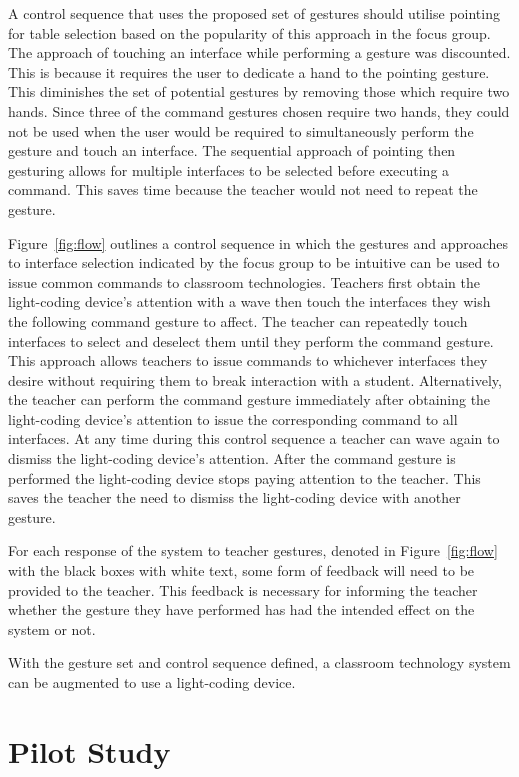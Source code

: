 \documentclass[link]{IWCOMP}
\begin{document}
A control sequence that uses the proposed set of gestures should utilise pointing for table selection based on the popularity of this approach in the focus group.
The approach of touching an interface while performing a gesture was discounted.  
This is because it requires the user to dedicate a hand to the pointing gesture.  
This diminishes the set of potential gestures by removing those which require two hands.
Since three of the command gestures chosen require two hands, they could not be used when the user would be required to simultaneously perform the gesture and touch an interface.
The sequential approach of pointing then gesturing allows for multiple interfaces to be selected before executing a command.
This saves time because the teacher would not need to repeat the gesture.

Figure~\ref{fig:flow} outlines a control sequence in which the gestures and approaches to interface selection indicated by the focus group to be intuitive can be used to issue common commands to classroom technologies.
Teachers first obtain the light-coding device's attention with a wave then touch the interfaces they wish the following command gesture to affect.
The teacher can repeatedly touch interfaces to select and deselect them until they perform the command gesture.
This approach allows teachers to issue commands to whichever interfaces they desire without requiring them to break interaction with a student.
Alternatively, the teacher can perform the command gesture immediately after obtaining the light-coding device's attention to issue the corresponding command to all interfaces.
At any time during this control sequence a teacher can wave again to dismiss the light-coding device's attention.
After the command gesture is performed the light-coding device stops paying attention to the teacher.
This saves the teacher the need to dismiss the light-coding device with another gesture.

For each response of the system to teacher gestures, denoted in Figure~\ref{fig:flow} with the black boxes with white text, some form of feedback will need to be provided to the teacher.
This feedback is necessary for informing the teacher whether the gesture they have performed has had the intended effect on the system or not.

With the gesture set and control sequence defined, a classroom technology system can be augmented to use a light-coding device.

\section{Pilot Study} 
\label{sec:pilotStudy}
\end{document}
